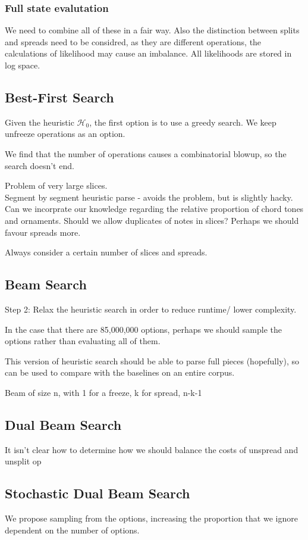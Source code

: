 \documentclass[12pt,a4paper,twoside,openright]{report}
\theoremstyle{definition}
\begin{document}
\FloatBarrier
\subsubsection{Full state evalutation}
We need to combine all of these in a fair way. Also the distinction between splits and spreads need to be considred, as they are different operations, the calculations of likelihood may cause an imbalance. All likelihoods are stored in log space.

\FloatBarrier
\subsection{Best-First Search}
Given the heuristic $\mathcal{H}_0$, the first option is to use a greedy search.
We keep unfreeze operations as an option.

We find that the number of operations causes a combinatorial blowup, so the search doesn't end.

Problem of very large slices.\\ 
Segment by segment heuristic parse - avoids the problem, but is slightly hacky. Can we incorprate our knowledge regarding the relative proportion of chord tones and ornaments. Should we allow duplicates of notes in slices? Perhaps we should favour spreads more. 

Always consider a certain number of slices and spreads.

\subsection{Beam Search}
Step 2: Relax the heuristic search in order to reduce runtime/ lower complexity.
\par 
In the case that there are 85,000,000 options, perhaps we should sample the options rather than evaluating all of them. 
\par 
This version of heuristic search should be able to parse full pieces (hopefully), so can be used to compare with the baselines on an entire corpus.
\par 
Beam of size n, with 1 for a freeze, k for spread, n-k-1 

\subsection{Dual Beam Search}
It isn't clear how to determine how we should balance the costs of unspread and unsplit op

\subsection{Stochastic Dual Beam Search}
We propose sampling from the options, increasing the proportion that we ignore dependent on the number of options.
\end{document}
